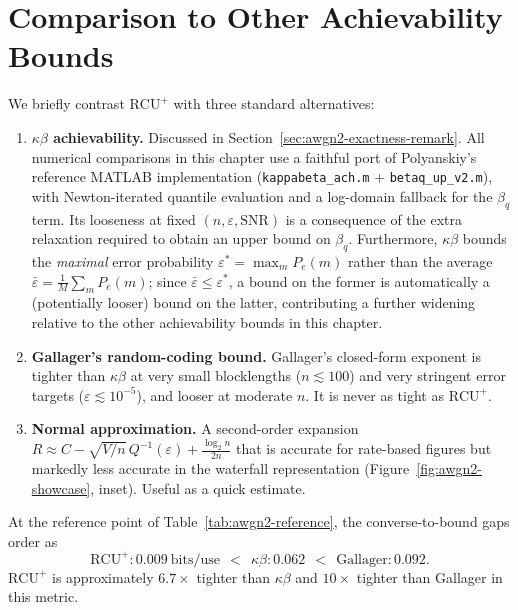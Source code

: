 \section{Comparison to Other Achievability Bounds}
\label{sec:awgn2-other-ach}

We briefly contrast $\mathrm{RCU}^+$ with three standard alternatives:
\begin{enumerate}
	\item \textbf{$\kappa\beta$ achievability.}  Discussed in Section~\ref{sec:awgn2-exactness-remark}.  All numerical comparisons in this chapter use a faithful port of Polyanskiy's reference MATLAB implementation (\texttt{kappabeta\_ach.m} + \texttt{betaq\_up\_v2.m}), with Newton-iterated quantile evaluation and a log-domain fallback for the $\beta_q$ term.  Its looseness at fixed $(n, \varepsilon, \mathrm{SNR})$ is a consequence of the extra relaxation required to obtain an upper bound on $\beta_q$.  Furthermore, $\kappa\beta$ bounds the \emph{maximal} error probability $\varepsilon^* = \max_m P_e(m)$ rather than the average $\bar\varepsilon = \frac{1}{M}\sum_m P_e(m)$; since $\bar\varepsilon \leq \varepsilon^*$, a bound on the former is automatically a (potentially looser) bound on the latter, contributing a further widening relative to the other achievability bounds in this chapter.
	\item \textbf{Gallager's random-coding bound.}  Gallager's closed-form exponent is tighter than $\kappa\beta$ at very small blocklengths ($n \lesssim 100$) and very stringent error targets ($\varepsilon \lesssim 10^{-5}$), and looser at moderate $n$.  It is never as tight as $\mathrm{RCU}^+$.
	\item \textbf{Normal approximation.}  A second-order expansion $R \approx C - \sqrt{V/n}\,Q^{-1}(\varepsilon) + \frac{\log_2 n}{2n}$ that is accurate for rate-based figures but markedly less accurate in the waterfall representation (Figure~\ref{fig:awgn2-showcase}, inset).  Useful as a quick estimate.
\end{enumerate}

At the reference point of Table~\ref{tab:awgn2-reference}, the converse-to-bound gaps order as
\begin{equation*}
	\mathrm{RCU}^+ : 0.009 \ \text{bits/use} \ \ <\ \  \kappa\beta : 0.062 \ \ <\ \  \mathrm{Gallager} : 0.092.
\end{equation*}
$\mathrm{RCU}^+$ is approximately $6.7\times$ tighter than $\kappa\beta$ and $10\times$ tighter than Gallager in this metric.

